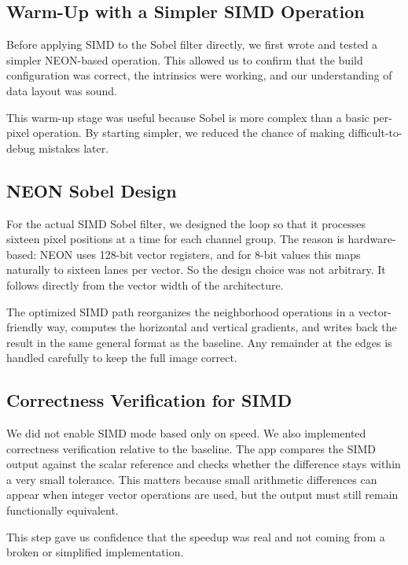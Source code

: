 \documentclass[12pt,a4paper]{article}
\begin{document}
\subsection{Warm-Up with a Simpler SIMD Operation}

Before applying SIMD to the Sobel filter directly, we first wrote and tested a simpler NEON-based operation. This allowed us to confirm that the build configuration was correct, the intrinsics were working, and our understanding of data layout was sound.

This warm-up stage was useful because Sobel is more complex than a basic per-pixel operation. By starting simpler, we reduced the chance of making difficult-to-debug mistakes later.

\subsection{NEON Sobel Design}

For the actual SIMD Sobel filter, we designed the loop so that it processes sixteen pixel positions at a time for each channel group. The reason is hardware-based: NEON uses 128-bit vector registers, and for 8-bit values this maps naturally to sixteen lanes per vector. So the design choice was not arbitrary. It follows directly from the vector width of the architecture.

The optimized SIMD path reorganizes the neighborhood operations in a vector-friendly way, computes the horizontal and vertical gradients, and writes back the result in the same general format as the baseline. Any remainder at the edges is handled carefully to keep the full image correct.

\subsection{Correctness Verification for SIMD}

We did not enable SIMD mode based only on speed. We also implemented correctness verification relative to the baseline. The app compares the SIMD output against the scalar reference and checks whether the difference stays within a very small tolerance. This matters because small arithmetic differences can appear when integer vector operations are used, but the output must still remain functionally equivalent.

This step gave us confidence that the speedup was real and not coming from a broken or simplified implementation.
\end{document}
